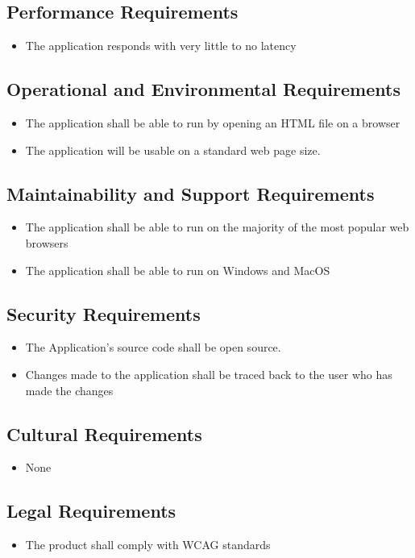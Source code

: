 \documentclass[12pt, titlepage]{article}
\begin{document}
\subsection{Performance Requirements}
\begin{itemize}
    \item The application responds with very little to no latency
\end{itemize}

\subsection{Operational and Environmental Requirements}
\begin{itemize}
    \item The application shall be able to run by opening an HTML file on a browser
    \item The application will be usable on a standard web page size.
\end{itemize}
\subsection{Maintainability and Support Requirements}
\begin{itemize}
\item The application shall be able to run on the majority of the most popular web browsers
\item The application shall be able to run on Windows and MacOS
\end{itemize}

\subsection{Security Requirements}
\begin{itemize}
    \item The Application's source code shall be open source.
    \item Changes made to the application shall be traced back to the user who has made the changes
\end{itemize}

\subsection{Cultural Requirements}
\begin{itemize}
    \item None
\end{itemize}
\subsection{Legal Requirements}
\begin{itemize}
    \item The product shall comply with WCAG standards
\end{itemize}
\end{document}
